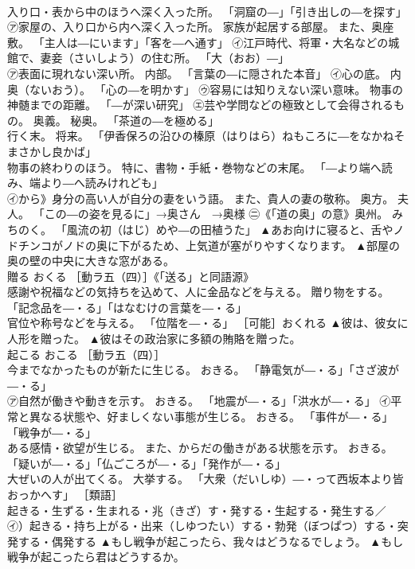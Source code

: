 \documentclass[8pt]{extreport}
\begin{document}
\begin{CJK}{UTF8}{min}
\\	入り口・表から中のほうへ深く入った所。 「洞窟の―」「引き出しの―を探す」 
\\	㋐家屋の、入り口から内へ深く入った所。 家族が起居する部屋。 また、奥座敷。 「主人は―にいます」「客を―へ通す」 ㋑江戸時代、将軍・大名などの城館で、妻妾（さいしよう）の住む所。 「大（おお）―」 
\\	㋐表面に現れない深い所。 内部。 「言葉の―に隠された本音」 ㋑心の底。 内奥（ないおう）。 「心の―を明かす」 ㋒容易には知りえない深い意味。 物事の神髄までの距離。 「―が深い研究」 ㋓芸や学問などの極致として会得されるもの。 奥義。 秘奥。 「茶道の―を極める」 
\\	行く末。 将来。 「伊香保ろの沿ひの榛原（はりはら）ねもころに―をなかねそまさかし良かば」 
\\	物事の終わりのほう。 特に、書物・手紙・巻物などの末尾。 「―より端へ読み、端より―へ読みけれども」 
\\	㋑から》身分の高い人が自分の妻をいう語。 また、貴人の妻の敬称。 奥方。 夫人。 「この―の姿を見るに」→奥さん　→奥様 ㊁《「道の奥」の意》奥州。 みちのく。 「風流の初（はじ）めや―の田植うた」	▲あお向けに寝ると、舌やノドチンコがノドの奥に下がるため、上気道が塞がりやすくなります。 ▲部屋の奥の壁の中央に大きな窓がある。
\\	贈る	おくる	［動ラ五（四）］《「送る」と同語源》 
\\	感謝や祝福などの気持ちを込めて、人に金品などを与える。 贈り物をする。 「記念品を―・る」「はなむけの言葉を―・る」 
\\	官位や称号などを与える。 「位階を―・る」 ［可能］おくれる	▲彼は、彼女に人形を贈った。 ▲彼はその政治家に多額の賄賂を贈った。
\\	起こる	おこる	［動ラ五（四）］ 
\\	今までなかったものが新たに生じる。 おきる。 「静電気が―・る」「さざ波が―・る」 
\\	㋐自然が働きや動きを示す。 おきる。 「地震が―・る」「洪水が―・る」 ㋑平常と異なる状態や、好ましくない事態が生じる。 おきる。 「事件が―・る」「戦争が―・る」 
\\	ある感情・欲望が生じる。 また、からだの働きがある状態を示す。 おきる。 「疑いが―・る」「仏ごころが―・る」「発作が―・る」 
\\	大ぜいの人が出てくる。 大挙する。 「大衆（だいしゆ）―・って西坂本より皆おっかへす」 ［類語］
\\	起きる・生ずる・生まれる・兆（きざ）す・発する・生起する・発生する／
\\	㋑）起きる・持ち上がる・出来（しゆつたい）する・勃発（ぼつぱつ）する・突発する・偶発する	▲もし戦争が起こったら、我々はどうなるでしょう。 ▲もし戦争が起こったら君はどうするか。

\end{CJK}
\end{document}
